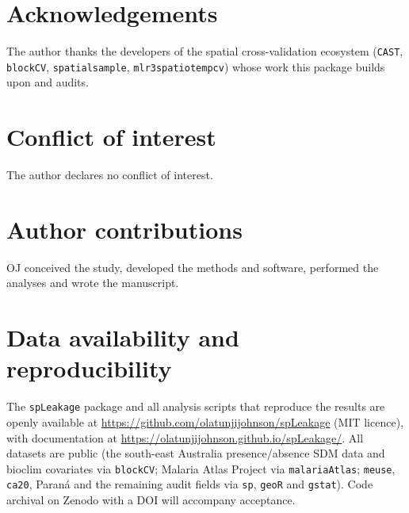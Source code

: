 \documentclass[11pt,a4paper]{article}
\begin{document}
\section*{Acknowledgements}
The author thanks the developers of the spatial cross-validation ecosystem
(\texttt{CAST}, \texttt{blockCV}, \texttt{spatialsample}, \texttt{mlr3spatiotempcv})
whose work this package builds upon and audits.

\section*{Conflict of interest}
The author declares no conflict of interest.

\section*{Author contributions}
OJ conceived the study, developed the methods and software, performed the analyses
and wrote the manuscript.

\section*{Data availability and reproducibility}
The \texttt{spLeakage} package and all analysis scripts that reproduce the results
are openly available at \url{https://github.com/olatunjijohnson/spLeakage} (MIT
licence), with documentation at \url{https://olatunjijohnson.github.io/spLeakage/}.
All datasets are public (the south-east Australia presence/absence SDM data and
bioclim covariates via \texttt{blockCV}; Malaria Atlas Project via
\texttt{malariaAtlas}; \texttt{meuse}, \texttt{ca20}, Paran\'a and the remaining
audit fields via \texttt{sp}, \texttt{geoR} and \texttt{gstat}). Code archival on
Zenodo with a DOI
will accompany acceptance.


\end{document}
